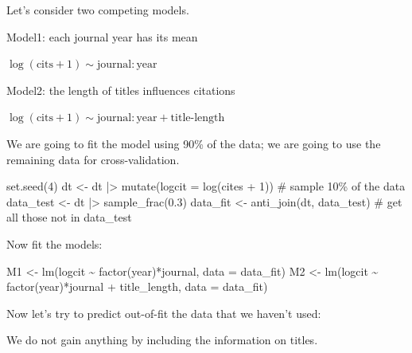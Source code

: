 \documentclass[
  letterpaper,
  DIV=11,
  numbers=noendperiod]{scrreprt}
\newenvironment{Shaded}{\begin{snugshade}}{\end{snugshade}}
\newcommand{\NormalTok}[1]{\textcolor[rgb]{0.00,0.23,0.31}{#1}}
\begin{document}
Let's consider two competing models.

Model1: each journal year has its mean

\(\log(\text{cits} + 1) \sim \text{journal}:\text{year}\)

Model2: the length of titles influences citations

\(\log(\text{cits} + 1) \sim \text{journal}:\text{year} + \text{title-length}\)

We are going to fit the model using 90\% of the data; we are going to
use the remaining data for cross-validation.

\begin{Shaded}
\begin{Highlighting}[]
\NormalTok{set.seed(4)}
\NormalTok{dt \textless{}{-} dt |\textgreater{} mutate(logcit = log(cites + 1))}
\NormalTok{\# sample 10\% of the data}
\NormalTok{data\_test \textless{}{-} dt |\textgreater{} sample\_frac(0.3)}
\NormalTok{data\_fit  \textless{}{-} anti\_join(dt, data\_test) \# get all those not in data\_test}
\end{Highlighting}
\end{Shaded}

Now fit the models:

\begin{Shaded}
\begin{Highlighting}[]
\NormalTok{M1 \textless{}{-} lm(logcit \textasciitilde{} factor(year)*journal, data = data\_fit)}
\NormalTok{M2 \textless{}{-} lm(logcit \textasciitilde{} factor(year)*journal + title\_length, data = data\_fit)}
\end{Highlighting}
\end{Shaded}

Now let's try to predict out-of-fit the data that we haven't used:

\begin{Shaded}
\end{Shaded}

We do not gain anything by including the information on titles.
\end{document}
